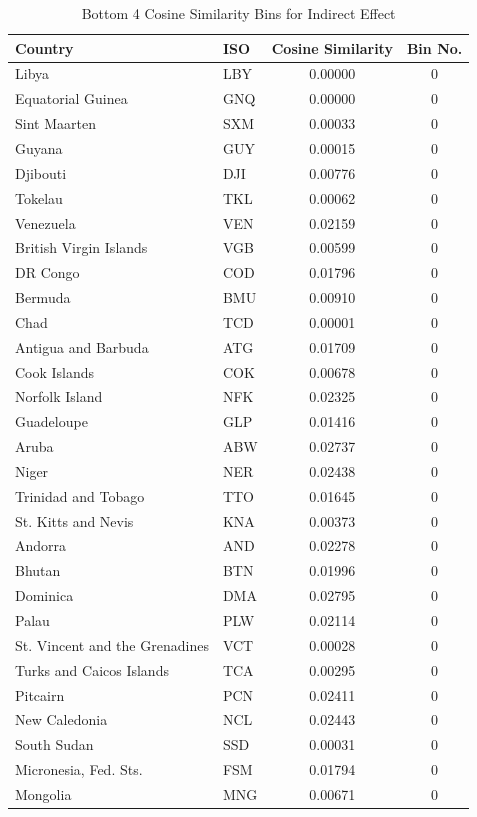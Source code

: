 \begin{table}[htbp]
\centering
\caption{Bottom 4 Cosine Similarity Bins for Indirect Effect}
\label{tab:bottom_cosine_similarity_bins_indirect_sim}
\begin{tabular}{llcc}
\toprule
Country & ISO & Cosine Similarity & Bin No. \\
\midrule
Libya & LBY &  0.00000 & 0 \\
Equatorial Guinea & GNQ &  0.00000 & 0 \\
Sint Maarten & SXM &  0.00033 & 0 \\
Guyana & GUY &  0.00015 & 0 \\
Djibouti & DJI &  0.00776 & 0 \\
Tokelau & TKL &  0.00062 & 0 \\
Venezuela & VEN &  0.02159 & 0 \\
British Virgin Islands & VGB &  0.00599 & 0 \\
DR Congo & COD &  0.01796 & 0 \\
Bermuda & BMU &  0.00910 & 0 \\
Chad & TCD &  0.00001 & 0 \\
Antigua and Barbuda & ATG &  0.01709 & 0 \\
Cook Islands & COK &  0.00678 & 0 \\
Norfolk Island & NFK &  0.02325 & 0 \\
Guadeloupe & GLP &  0.01416 & 0 \\
Aruba & ABW &  0.02737 & 0 \\
Niger & NER &  0.02438 & 0 \\
Trinidad and Tobago & TTO &  0.01645 & 0 \\
St. Kitts and Nevis & KNA &  0.00373 & 0 \\
Andorra & AND &  0.02278 & 0 \\
Bhutan & BTN &  0.01996 & 0 \\
Dominica & DMA &  0.02795 & 0 \\
Palau & PLW &  0.02114 & 0 \\
St. Vincent and the Grenadines & VCT &  0.00028 & 0 \\
Turks and Caicos Islands & TCA &  0.00295 & 0 \\
Pitcairn & PCN &  0.02411 & 0 \\
New Caledonia & NCL &  0.02443 & 0 \\
South Sudan & SSD &  0.00031 & 0 \\
Micronesia, Fed. Sts. & FSM &  0.01794 & 0 \\
Mongolia & MNG &  0.00671 & 0 \\

\end{tabular}
\end{table}
